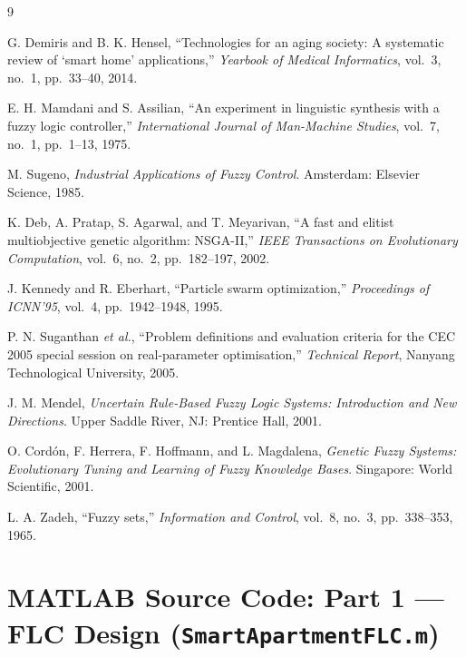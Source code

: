 \documentclass[10pt,twocolumn,a4paper]{article}
\begin{document}

\begin{thebibliography}{9}

G. Demiris and B. K. Hensel, ``Technologies for an aging society: A systematic review of `smart home' applications,'' \textit{Yearbook of Medical Informatics}, vol.~3, no.~1, pp.~33--40, 2014.

E. H. Mamdani and S. Assilian, ``An experiment in linguistic synthesis with a fuzzy logic controller,'' \textit{International Journal of Man-Machine Studies}, vol.~7, no.~1, pp.~1--13, 1975.

M. Sugeno, \textit{Industrial Applications of Fuzzy Control}. Amsterdam: Elsevier Science, 1985.

K. Deb, A. Pratap, S. Agarwal, and T. Meyarivan, ``A fast and elitist multiobjective genetic algorithm: NSGA-II,'' \textit{IEEE Transactions on Evolutionary Computation}, vol.~6, no.~2, pp.~182--197, 2002.

J. Kennedy and R. Eberhart, ``Particle swarm optimization,'' \textit{Proceedings of ICNN'95}, vol.~4, pp.~1942--1948, 1995.

P. N. Suganthan \textit{et al.}, ``Problem definitions and evaluation criteria for the CEC\,2005 special session on real-parameter optimisation,'' \textit{Technical Report}, Nanyang Technological University, 2005.

J. M. Mendel, \textit{Uncertain Rule-Based Fuzzy Logic Systems: Introduction and New Directions}. Upper Saddle River, NJ: Prentice Hall, 2001.

O. Cord\'on, F. Herrera, F. Hoffmann, and L. Magdalena, \textit{Genetic Fuzzy Systems: Evolutionary Tuning and Learning of Fuzzy Knowledge Bases}. Singapore: World Scientific, 2001.

L. A. Zadeh, ``Fuzzy sets,'' \textit{Information and Control}, vol.~8, no.~3, pp.~338--353, 1965.

\end{thebibliography}

\appendix
\onecolumn

\section{MATLAB Source Code: Part 1 --- FLC Design (\texttt{SmartApartmentFLC.m})}
\label{app:part1}
\end{document}
